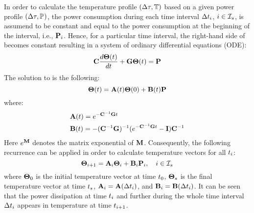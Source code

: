 In order to calculate the temperature profile $(\Delta \tau, \mathbb{T})$ based on a given power profile $(\Delta \tau, \mathbb{P}_{})$, the power consumption during each time interval $\Delta t_i$, $i \in \mathcal{I}_s$, is assumend to be constant and equal to the power consumption at the beginning of the interval, i.e., $\mathbf{P}_i$. Hence, for a particular time interval, the right-hand side of  becomes constant resulting in a system of ordinary differential equations (ODE):
\begin{equation} \equlabel{fourier-constant-power}
  \mcapacitance \frac{d\vtemp(\time)}{d\time} + \mconductance \vtemp(\time) = \vpower
\end{equation}
The solution to  is the following:
\[
  \mathbf{\Theta}(t) = \mathbf{A}(t) \mathbf{\Theta}(0) + \mathbf{B}(t) \mathbf{P}
\]
where:
\begin{align}
  & \m{A}(\time) = \emcg{\time} \equlabel{a} \\
  & \m{B}(\time) = -(\cg)^{-1}(\emcg{\time} - \mone) \mcapacitance^{-1} \equlabel{b}
\end{align}
Here $e^{\mathbf{M}}$ denotes the matrix exponential of $\mathbf{M}$. Consequently, the following recurrence can be applied in order to calculate temperature vectors for all $t_i$:
\begin{equation} \equlabel{fourier-recurrence}
  \vtemp_{i+1} = \m{A}_i \vtemp_i + \m{B}_i \vpower_i, \sep i \in \timeindex
\end{equation}
where $\mathbf{\Theta}_0$ is the initial temperature vector at time $t_0$, $\mathbf{\Theta}_s$ is the final temperature vector at time $t_s$, $\mathbf{A}_i = \mathbf{A}(\Delta t_i)$, and $\mathbf{B}_i = \mathbf{B}(\Delta t_i)$. It can be seen that the power dissipation at time $t_i$ and further during the whole time interval $\Delta t_i$ appears in temperature at time $t_{i+1}$.
